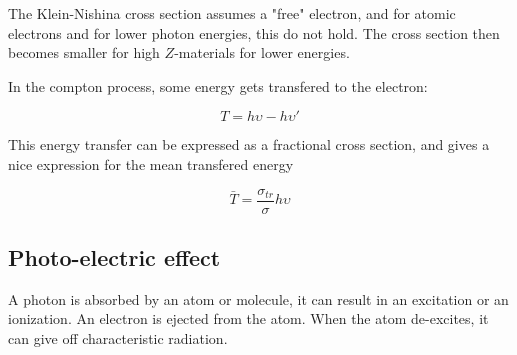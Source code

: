 
The Klein-Nishina cross section assumes a "free" electron, and for atomic electrons and for lower photon energies, this do not hold.
The cross section then becomes smaller for high $Z$-materials for lower energies.

In the compton process, some energy gets transfered to the electron:

\begin{equation}
    T = h\upsilon - h \upsilon'
\end{equation}

This energy transfer can be expressed as a fractional cross section, and gives a nice expression for the mean transfered energy

\begin{equation}
    \bar{T} = \frac{\sigma_{tr}}{\sigma} h \upsilon
\end{equation}

\subsection{Photo-electric effect}

A photon is absorbed by an atom or molecule, it can result in an excitation or an ionization.
An electron is ejected from the atom.
When the atom de-excites, it can give off characteristic radiation.

